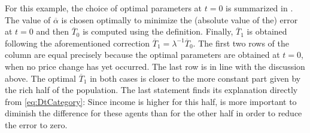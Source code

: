 \documentclass[english, a4paper, 12pt]{article}
\begin{document}
For this example, the choice of optimal parameters at $t = 0$ is summarized in . The value of $\overline{\alpha}$ is chosen optimally to minimize the (absolute value of the) error at $t = 0$ and then $\overline{T}_{0}$ is computed using the definition. Finally, $\overline{T}_{1}$ is obtained following the aforementioned correction $\overline{T}_{1} = \lambda^{-1}\overline{T}_{0}$. The first two rows of the column are equal precisely because the optimal parameters are obtained at $t =0$, when no price change has yet occurred. The last row is in line with the discussion above. The optimal $\overline{T}_{1}$ in both cases is closer to the more constant part given by the rich half of the population. The last statement finds its explanation directly from \eqref{eq:DtCategory}: Since income is higher for this half, is more important to diminish the difference for these agents than for the other half in order to reduce the error to zero.
\end{document}
